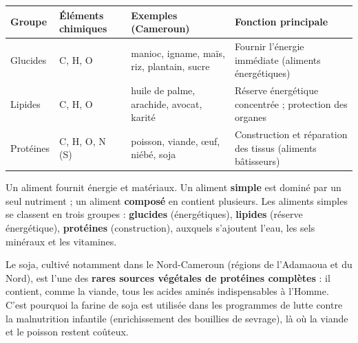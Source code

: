 \documentclass[11pt]{article}
\begin{document}
\begin{center}
\begin{tabularx}{\linewidth}{|l|X|X|X|}
\hline
\rowcolor{popblueL} \textbf{Groupe} & \textbf{Éléments chimiques} & \textbf{Exemples (Cameroun)} & \textbf{Fonction principale} \\
\hline
Glucides & C, H, O & manioc, igname, maïs, riz, plantain, sucre & Fournir l'énergie immédiate (aliments énergétiques) \\
\hline
Lipides & C, H, O & huile de palme, arachide, avocat, karité & Réserve énergétique concentrée ; protection des organes \\
\hline
Protéines & C, H, O, N (S) & poisson, viande, œuf, niébé, soja & Construction et réparation des tissus (aliments bâtisseurs) \\
\hline
\end{tabularx}
\end{center}

\begin{aretenir}[L'essentiel]
Un aliment fournit énergie et matériaux. Un aliment \textbf{simple} est dominé par un seul nutriment ; un aliment \textbf{composé} en contient plusieurs. Les aliments simples se classent en trois groupes : \textbf{glucides} (énergétiques), \textbf{lipides} (réserve énergétique), \textbf{protéines} (construction), auxquels s'ajoutent l'eau, les sels minéraux et les vitamines.
\end{aretenir}

\begin{savaistu}
Le soja, cultivé notamment dans le Nord-Cameroun (régions de l'Adamaoua et du Nord), est l'une des \textbf{rares sources végétales de protéines complètes} : il contient, comme la viande, tous les acides aminés indispensables à l'Homme. C'est pourquoi la farine de soja est utilisée dans les programmes de lutte contre la malnutrition infantile (enrichissement des bouillies de sevrage), là où la viande et le poisson restent coûteux.
\end{savaistu}
\end{document}
